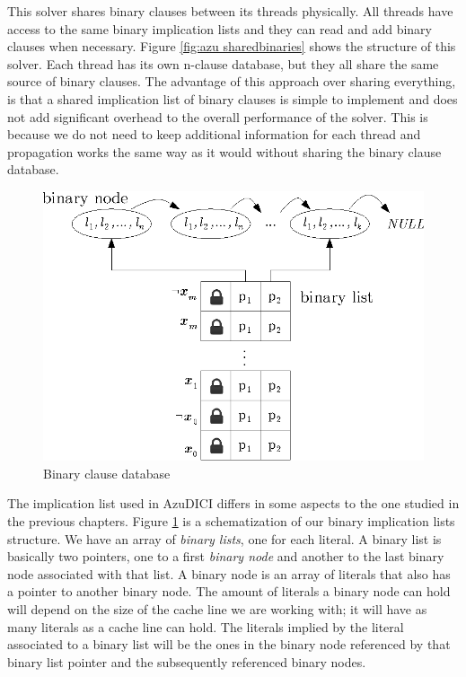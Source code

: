 \documentclass[12pt]{diicc}
\begin{document}
This solver shares binary clauses between its threads physically. All threads have access to the same binary implication lists and they can read and add binary clauses when necessary. Figure \ref{fig:azu sharedbinaries} shows the structure of this solver. Each thread has its own n-clause database, but they all share the same source of binary clauses. The advantage of this approach over sharing everything, is that a shared implication list of binary clauses is simple to implement and does not add significant overhead to the overall performance of the solver. This is because we do not need to keep additional information for each thread and propagation works the same way as it would without sharing the binary clause database.

\begin{figure}[tp]
  \centering
  \includegraphics[scale=1.0]{implication_list}
  \caption{Binary clause database}
  \label{fig:shared bins}
\end{figure}

The implication list used in AzuDICI differs in some aspects to the one studied in the previous chapters. Figure \ref{fig:shared bins} is a schematization of our 
binary implication lists structure. We have an array of \textit{binary 
lists}, one for each literal. A binary list is basically two pointers, 
one to a first \textit{binary node} and another to the last binary node 
associated with that list. A 
binary node is an array of literals that also has a pointer to another 
binary node. The amount of literals a binary node can hold will depend 
on the size of the cache line we are working with; it will have as many 
literals as a cache line can hold. The literals implied by the literal 
associated to a binary list will be the ones in the binary node 
referenced by that binary list pointer and the subsequently referenced 
binary nodes. 
\end{document}
